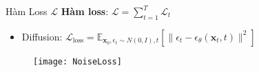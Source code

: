 
\begin{frame}{Hàm Loss $\mathcal{L}$}
		\textbf{Hàm loss}: $\mathcal{L} = \sum_{t=1}^{T} \mathcal{L}_t$
		
	\begin{itemize}
		\item Diffusion: $\mathcal{L}_{\text{loss}}= \mathbb{E}_{\mathbf{x}_0, \epsilon_t \sim N(0, I), t} \left[ \| \epsilon_t - \epsilon_\theta(\mathbf{x}_t, t) \|^2 \right]$
	\end{itemize}
	\begin{figure}
		\centering
		\texttt{[image: NoiseLoss]}
	\end{figure}
\end{frame}


